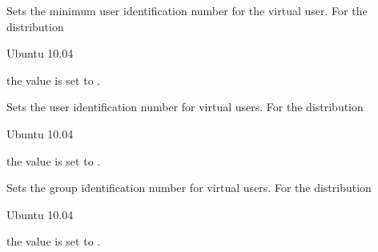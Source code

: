 Sets the minimum user identification number  for the virtual user.
For the distribution
\begin{inparaitem}
\item[\TheDistribution{ubuntu}] Ubuntu 10.04
\end{inparaitem}
the value is set to .


Sets the user identification number  for virtual users.
For the distribution
\begin{inparaitem}
\item[\TheDistribution{ubuntu}] Ubuntu 10.04
\end{inparaitem}
the value is set to .


Sets the group identification number  for virtual users.
For the distribution
\begin{inparaitem}
\item[\TheDistribution{ubuntu}] Ubuntu 10.04
\end{inparaitem}
the value is set to .

